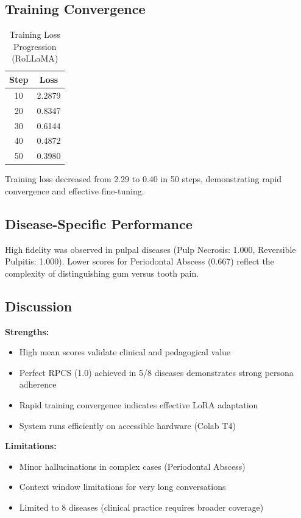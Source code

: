 \documentclass[runningheads,a4paper,11pt]{report}
\begin{document}
\subsection{Training Convergence}

\begin{table}[htbp]
\caption{Training Loss Progression (RoLLaMA)}
\label{tab:trainingLoss}
\begin{center}
\begin{tabular}{|c|c|}
\hline
\textbf{Step} & \textbf{Loss} \\
\hline
10 & 2.2879 \\
20 & 0.8347 \\
30 & 0.6144 \\
40 & 0.4872 \\
50 & 0.3980 \\
\hline
\end{tabular}
\end{center}
\end{table}

Training loss decreased from 2.29 to 0.40 in 50 steps, demonstrating rapid convergence and effective fine-tuning.

\subsection{Disease-Specific Performance}

High fidelity was observed in pulpal diseases (Pulp Necrosis: 1.000, Reversible Pulpitis: 1.000). Lower scores for Periodontal Abscess (0.667) reflect the complexity of distinguishing gum versus tooth pain.

\subsection{Discussion}

\textbf{Strengths:}
\begin{itemize}
\item High mean scores validate clinical and pedagogical value
\item Perfect RPCS (1.0) achieved in 5/8 diseases demonstrates strong persona adherence
\item Rapid training convergence indicates effective LoRA adaptation
\item System runs efficiently on accessible hardware (Colab T4)
\end{itemize}

\textbf{Limitations:}
\begin{itemize}
\item Minor hallucinations in complex cases (Periodontal Abscess)
\item Context window limitations for very long conversations
\item Limited to 8 diseases (clinical practice requires broader coverage)
\end{itemize}
\end{document}
